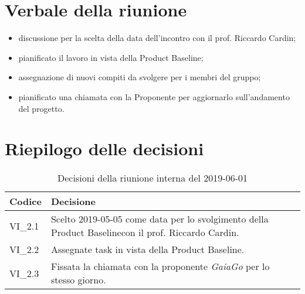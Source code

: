 \section{Verbale della riunione}
\begin{itemize}
	\item discussione per la scelta della data dell'incontro con il prof. Riccardo Cardin;
	\item pianificato il lavoro in vista della Product Baseline\glo;
	\item assegnazione di nuovi compiti da svolgere per i membri del gruppo;
	\item pianificato una chiamata con la Proponente per aggiornarlo sull'andamento del progetto.

\end{itemize} 

\section{Riepilogo delle decisioni}

	
	\begin{longtable}{ >{\centering}p{} >{}p{}}
		\caption{Decisioni della riunione interna del 2019-06-01}\\	
		\rowcolorhead
		\textbf{\color{white}Codice} 
		& \centering\textbf{\color{white}Decisione} 
		\tabularnewline 
		\endfirsthead
		VI\_2.1 & Scelto 2019-05-05 come data per lo svolgimento della Product Baseline\glosp con il prof. Riccardo Cardin.
		
		\tabularnewline 
		VI\_2.2 & Assegnate task in vista della Product Baseline.
		
		\tabularnewline 
		VI\_2.3 & Fissata la chiamata con la proponente \textit{GaiaGo} per lo stesso giorno.
		
	\end{longtable}
	




